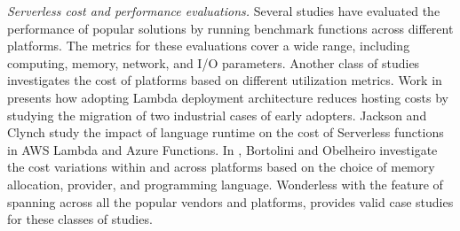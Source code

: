 \vspace{2mm}
\emph{Serverless cost and performance evaluations.} 
Several studies\cite{wang2018peeking, 
	lloyd2018serverless, figiela2018performance, lee2018evaluation, 
	mcgrath2017serverless, back2018using, mohanty2018evaluation} 
have evaluated the performance of popular \faas solutions by running 
benchmark functions across different platforms. The metrics for these 
evaluations cover a wide range, including computing, memory, network, and 
I/O parameters. Another class of studies investigates the cost of \faas platforms 
based on different utilization metrics. Work in \cite{adzic2017serverless} 
presents how adopting Lambda deployment architecture reduces hosting costs 
by studying the migration of two industrial cases of early adopters.
Jackson and Clynch\cite{jackson2018investigation} study the impact of 
language runtime on the cost of Serverless functions in AWS Lambda and 
Azure Functions. In \cite{bortolini2019investigating}, Bortolini and Obelheiro 
investigate the cost variations within and across \faas platforms 
based on the choice of memory allocation, \faas provider, and 
programming language. Wonderless with the feature of spanning across 
all the popular vendors and platforms, provides valid case studies for 
these classes of studies.

